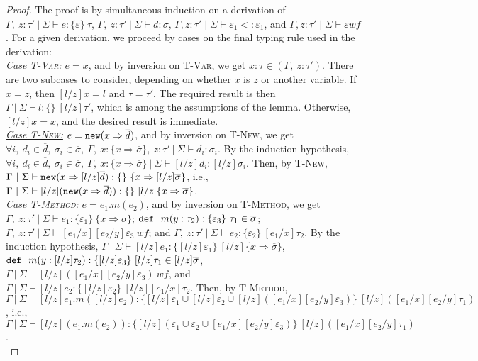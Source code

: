 \begin{proof} The proof is by simultaneous induction on a derivation of $\Gamma,~z : \tau'~|~\Sigma \vdash e : \{ \varepsilon \}~\tau$, $\Gamma,~z : \tau'~|~\Sigma \vdash d : \sigma$, $\Gamma, z :\tau' \mid \Sigma \vdash \varepsilon_1 <: \varepsilon_1$, and $\Gamma, z : \tau' \mid \Sigma \vdash \varepsilon wf$. For a given derivation, we proceed by cases on the final typing rule used in the derivation:\\

\noindent\underline{\textit{Case \textsc{T-Var}:}} $e = x$, and by inversion on \textsc{T-Var}, we get \mbox{$x : \tau \in (\Gamma,~z : \tau')$}. There are two subcases to consider, depending on whether $x$ is $z$ or another variable. If $x = z$, then $[l/z]x = l$ and $\tau = \tau'$. The required result is then $\Gamma~|~\Sigma \vdash l : \{ \}~[l/z]\tau'$, which is among the assumptions of the lemma. Otherwise, $[l/z]x = x$, and the desired result is immediate.\\

\noindent\underline{\textit{Case \textsc{T-New}:}} \mbox{$e = \mathtt{new}(x \Rightarrow \overline{d})$}, and by inversion on \textsc{T-New}, we get\linebreak
\mbox{$\forall i,~d_i \in \overline{d},~\sigma_i \in \overline{\sigma},~\Gamma,~x : \{ x \Rightarrow \overline{\sigma} \},~z : \tau'~|~\Sigma \vdash d_i : \sigma_i$}. By the induction hypothesis,
\mbox{$\forall i,~d_i \in \overline{d},~\sigma_i \in \overline{\sigma},~\Gamma,~x : \{ x \Rightarrow \overline{\sigma} \}~|~\Sigma \vdash [l/z]d_i : [l/z]\sigma_i$}. Then, by \textsc{T-New},
\mbox{$\Gamma~|~\Sigma \vdash \mathtt{new}(x \Rightarrow [l/z]\overline{d}) : \{ \}~\{ x \Rightarrow [l/z]\overline{\sigma} \}$}, i.e.,
\mbox{$\Gamma~|~\Sigma \vdash [l/z](\mathtt{new}(x \Rightarrow \overline{d})) : \{ \}~[l/z]\{ x \Rightarrow \overline{\sigma} \}$}.\\

\noindent\underline{\textit{Case \textsc{T-Method}:}} \mbox{$e = e_1.m(e_2)$}, and by inversion on \textsc{T-Method}, we get
\mbox{$\Gamma,~z : \tau'~|~\Sigma \vdash e_1 : \{ \varepsilon_1 \}~\{ x \Rightarrow \overline{\sigma} \}$}; \mbox{$\mathtt{def}~~ m(y : \tau_2) : \{ \varepsilon_3 \}~\tau_1 \in \overline{\sigma}$};
\mbox{$\Gamma,~z : \tau'~|~\Sigma \vdash [e_1/x][e_2/y]\varepsilon_3~\mathit{wf}$}; and $\Gamma,~z : \tau'~|~\Sigma \vdash e_2 : \{ \varepsilon_2 \}~[e_1/x]\tau_2$. By the induction hypothesis, \mbox{$\Gamma~|~\Sigma \vdash [l/z]e_1 : \{ [l/z]\varepsilon_1 \}~[l/z]\{ x \Rightarrow \overline{\sigma} \}$},
\mbox{$\mathtt{def}~~ m(y : [l/z]\tau_2) : \{ [l/z]\varepsilon_3 \}~[l/z]\tau_1 \in [l/z]\overline{\sigma}$}, \mbox{$\Gamma~|~\Sigma \vdash [l/z]([e_1/x][e_2/y]\varepsilon_3)~\mathit{wf}$}, and
\mbox{$\Gamma~|~\Sigma \vdash [l/z]e_2 : \{ [l/z]\varepsilon_2 \}~[l/z][e_1/x]\tau_2$}. Then, by \mbox{\textsc{T-Method}},
\mbox{$\Gamma~|~\Sigma \vdash [l/z]e_1.m([l/z]e_2) : \{ [l/z]\varepsilon_1 \cup [l/z]\varepsilon_2 \cup [l/z]([e_1/x][e_2/y]\varepsilon_3) \}~[l/z]([e_1/x][e_2/y]\tau_1)$},
i.e., \mbox{$\Gamma~|~\Sigma \vdash [l/z](e_1.m(e_2)) : \{ [l/z](\varepsilon_1 \cup \varepsilon_2 \cup [e_1/x][e_2/y]\varepsilon_3) \}~[l/z]([e_1/x][e_2/y]\tau_1)$}.\\


\end{proof}
